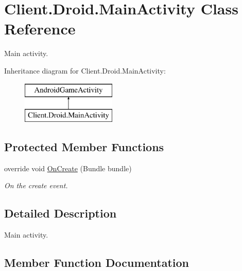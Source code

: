 \hypertarget{classClient_1_1Droid_1_1MainActivity}{}\section{Client.\+Droid.\+Main\+Activity Class Reference}
\label{classClient_1_1Droid_1_1MainActivity}


Main activity.  


Inheritance diagram for Client.\+Droid.\+Main\+Activity\+:\begin{figure}[H]
\begin{center}
\leavevmode
\includegraphics[height=2.000000cm]{classClient_1_1Droid_1_1MainActivity}
\end{center}
\end{figure}
\subsection*{Protected Member Functions}
\begin{DoxyCompactItemize}
\item 
override void \hyperlink{classClient_1_1Droid_1_1MainActivity_a81c1652b05e56f45d7d6291f2fee2e3a}{On\+Create} (Bundle bundle)
\begin{DoxyCompactList}\small\item\em On the create event. \end{DoxyCompactList}\end{DoxyCompactItemize}


\subsection{Detailed Description}
Main activity. 



\subsection{Member Function Documentation}
\hypertarget{classClient_1_1Droid_1_1MainActivity_a81c1652b05e56f45d7d6291f2fee2e3a}{}
